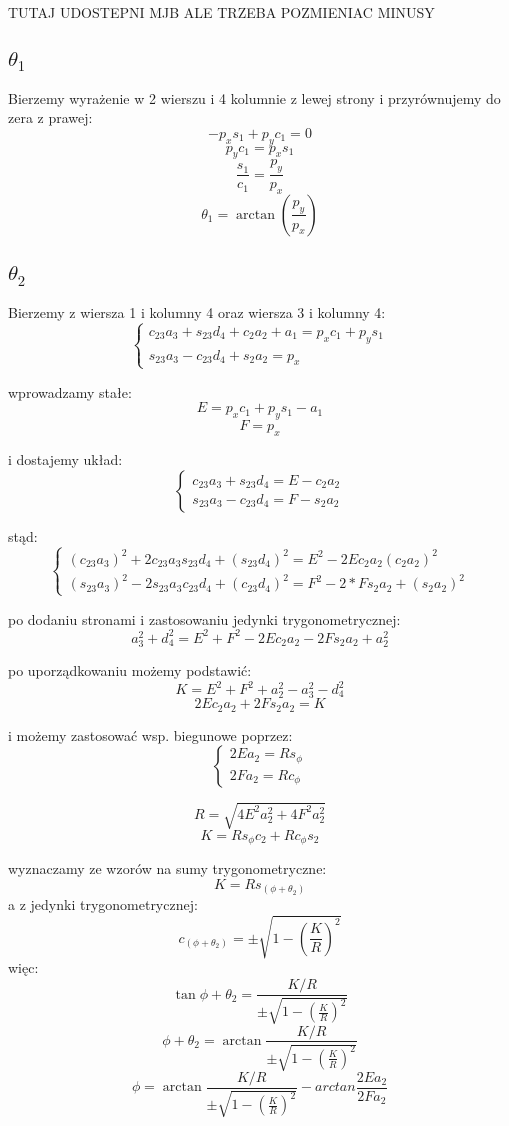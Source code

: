 \documentclass[]{article}
\begin{document}
TUTAJ UDOSTEPNI MJB ALE TRZEBA POZMIENIAC MINUSY
\subsection{$\theta_1$}
Bierzemy wyrażenie w 2 wierszu i 4 kolumnie z lewej strony i przyrównujemy do zera z prawej:
\[ -p_xs_1 + p_yc_1 = 0 \]
\[ p_yc_1 = p_xs_1 \]
\[ \frac{s_1}{c_1} = \frac{p_y}{p_x} \]
\[ \theta_1 = \arctan(\frac{p_y}{p_x})\]
\subsection{$\theta_2$}
Bierzemy z wiersza 1 i kolumny 4 oraz wiersza 3 i kolumny 4:
\[ \left\{\begin{array}{c}
c_{23}a_3 + s_{23}d_4 + c_2a_2 + a_1 = p_x c_1 + p_y s_1 \\
s_{23}a_3 - c_{23}d_4+s_2a_2 = p_x 
\end{array} \right. \]

wprowadzamy stałe:
\[ E = p_xc_1 + p_ys_1 -a_1\]
\[F = p_x\]

i dostajemy układ:
\[ \left\{\begin{array}{c}
c_{23}a_3 + s_{23}d_4 = E - c_2a_2\\
s_{23}a_3 - c_{23}d_4 = F - s_2a_2 
\end{array} \right. \]

stąd:
\[ \left\{\begin{array}{c}
(c_{23}a_3)^2 + 2c_{23}a_3s_{23}d_4 + (s_{23}d_4)^2 = E^2 -2Ec_2a_2 (c_2a_2)^2 \\
(s_{23}a_3)^2 -2s_{23}a_3c_{23}d_4 + (c_{23}d_4)^2 = F^2 - 2*Fs_2a_2 + (s_2a_2)^2 
\end{array} \right. \]

po dodaniu stronami i zastosowaniu jedynki trygonometrycznej:
\[ a_3^2 + d_4^2 = E^2 + F^2 -2Ec_2a_2 - 2Fs_2a_2 + a_2^2 \]

po uporządkowaniu możemy podstawić:
\[ K = E^2 + F^2 + a_2^2 - a_3^2 - d_4^2 \]
\[2Ec_2a_2 + 2Fs_2a_2 = K \]

i możemy zastosować wsp. biegunowe poprzez:
\[ \left\{\begin{array}{c}
2Ea_2 = Rs_\phi \\
2Fa_2 = Rc_\phi
\end{array} \right. \]

\[ R = \sqrt{4E^2a_2^2 + 4F^2a_2^2} \]
\[ K = Rs_\phi c_2 + Rc_\phi s_2 \]

wyznaczamy ze wzorów na sumy trygonometryczne:
\[ K = Rs_{(\phi + \theta_2)} \]
a z jedynki trygonometrycznej:
\[ c_{(\phi + \theta_2)} = \pm\sqrt{1-(\frac{K}{R})^2} \]
więc:
\[ \tan{\phi + \theta_2}  = \frac{K/R}{\pm \sqrt{1-(\frac{K}{R})^2}}\]
\[ \phi + \theta_2  = \arctan{\frac{K/R}{\pm \sqrt{1-(\frac{K}{R})^2}}}\]
\[ \phi  = \arctan{\frac{K/R}{\pm \sqrt{1-(\frac{K}{R})^2}}} - arctan{\frac{2Ea_2}{2Fa_2}}\]
\end{document}
